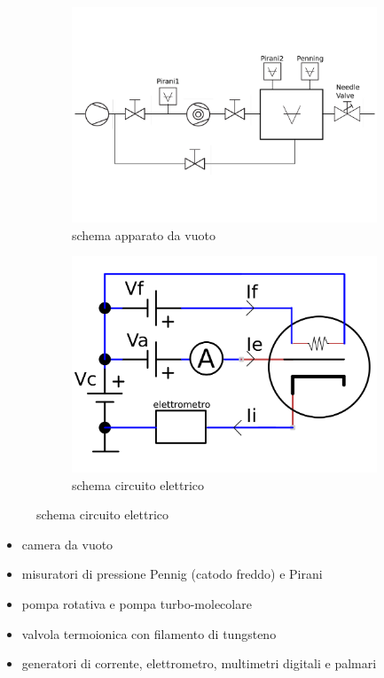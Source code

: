 \documentclass[11pt,a4paper]{article}
\begin{document}
\begin{figure}[!h]
  \begin{subfigure}[b]{0.6\textwidth}
    \includegraphics[width=\textwidth]{vuoto}
    \caption{schema apparato da vuoto} %
    \label{fig:f1}
  \end{subfigure}
  \hfill
  \begin{subfigure}[b]{0.4\textwidth}
    \includegraphics[width=\textwidth]{elettrico}
    \caption{schema circuito elettrico} %
    \label{fig:f2}
  \end{subfigure}
\end{figure}

\begin{itemize}
\item camera da vuoto
\item misuratori di pressione Pennig (catodo freddo) e Pirani
\item pompa rotativa e pompa turbo-molecolare
\item valvola termoionica con filamento di tungsteno
\item generatori di corrente, elettrometro, multimetri digitali e palmari 
\end{itemize} 
\end{document}
